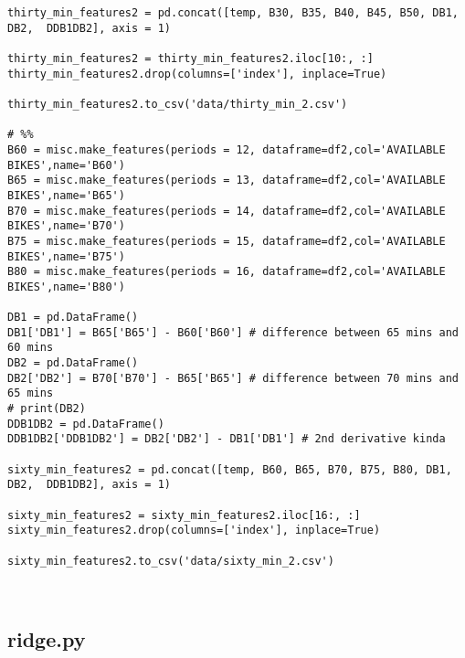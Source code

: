 \begin{verbatim}
thirty_min_features2 = pd.concat([temp, B30, B35, B40, B45, B50, DB1, DB2,  DDB1DB2], axis = 1)

thirty_min_features2 = thirty_min_features2.iloc[10:, :]
thirty_min_features2.drop(columns=['index'], inplace=True)

thirty_min_features2.to_csv('data/thirty_min_2.csv')

# %%
B60 = misc.make_features(periods = 12, dataframe=df2,col='AVAILABLE BIKES',name='B60')
B65 = misc.make_features(periods = 13, dataframe=df2,col='AVAILABLE BIKES',name='B65')
B70 = misc.make_features(periods = 14, dataframe=df2,col='AVAILABLE BIKES',name='B70')
B75 = misc.make_features(periods = 15, dataframe=df2,col='AVAILABLE BIKES',name='B75')
B80 = misc.make_features(periods = 16, dataframe=df2,col='AVAILABLE BIKES',name='B80')

DB1 = pd.DataFrame()
DB1['DB1'] = B65['B65'] - B60['B60'] # difference between 65 mins and 60 mins
DB2 = pd.DataFrame()
DB2['DB2'] = B70['B70'] - B65['B65'] # difference between 70 mins and 65 mins
# print(DB2)
DDB1DB2 = pd.DataFrame()
DDB1DB2['DDB1DB2'] = DB2['DB2'] - DB1['DB1'] # 2nd derivative kinda

sixty_min_features2 = pd.concat([temp, B60, B65, B70, B75, B80, DB1, DB2,  DDB1DB2], axis = 1)

sixty_min_features2 = sixty_min_features2.iloc[16:, :]
sixty_min_features2.drop(columns=['index'], inplace=True)

sixty_min_features2.to_csv('data/sixty_min_2.csv')



\end{verbatim}

\subsection{ridge.py}

